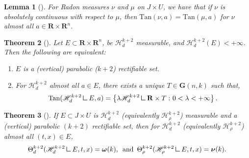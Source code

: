 \documentclass{article}
\theoremstyle{plain}
\newtheorem{theorem}{Theorem}[section]
\theoremstyle{definition}
\theoremstyle{plain}
\newtheorem{lemma}[theorem]{Lemma}
\theoremstyle{remark}
\theoremstyle{remark}
\theoremstyle{plain}
\newcommand{\weight}{\mathbin{\vrule height 1.6ex depth 0pt width
		0.14ex\vrule height 0.14ex depth 0pt width 1.3ex}}
\begin{document}
\begin{lemma}[]\label{lem: equality of tangent measure for a.c. measures}
    For Radon measures $\nu$ and $\mu$ on $J \times U$, we have that if $\nu$ is absolutely continuous with respect to $\mu$, then $\mathrm{Tan} (\nu, a) = \mathrm{Tan} (\mu, a)$ for $\nu$ almost all $a \in \mathbf{R} \times \mathbf{R}^{n}$.
\end{lemma}

\begin{theorem}[]\label{thm: rectifiability thm from Mattila}
    Let $E \subset \mathbf{R} \times \mathbf{R}^{n}$,  be $\mathscr{H}^{k + 2}_{d}$ measurable, and $\mathscr{H}_{d}^{k + 2} (E) < + \infty$. 
    Then the following are equivalent: 
    \begin{enumerate}
        \item $E$ is a (vertical) parabolic ($k+2$) rectifiable set.
        \item For $\mathscr{H}^{k+2}_{d}$ almost all $a \in E$, there exists a unique $T \in \mathbf{G} (n, k)$ such that, 
        \begin{equation*}
            \mathrm{Tan} (\mathscr{H}^{k + 2}_{d} \weight E, a) = \left\{ \lambda \mathscr{H}_{d}^{k + 2} \weight \mathbf{R} \times T \, \colon 0 < \lambda < + \infty \right\}. 
        \end{equation*}
    \end{enumerate}
\end{theorem}

\begin{theorem}[]\label{thm: mattila existence of density a.e. for parabolic rectifiable sets}
    If $E \subset J \times U$ is $\mathscr{H}^{k + 2}_{d}$ (equivalently $\mathscr{H}_{\rho}^{k + 2}$) measurable and a (vertical) parabolic $(k+2)$ rectifiable set, then for $\mathscr{H}^{k + 2}_{d}$ (equivalently $\mathscr{H}_{\rho}^{k + 2}$) almost all $(t, x) \in E$, 
    \begin{equation*}
        \Theta^{k + 2}_{d} (\mathscr{H}^{k + 2}_{d} \weight E, t, x) = \boldsymbol{\omega} (k), \, \text{ and } \, \Theta^{k + 2}_{\rho} (\mathscr{H}^{k + 2}_{\rho} \weight E, t, x) = \boldsymbol{\nu} (k).
    \end{equation*}
\end{theorem}
\end{document}
